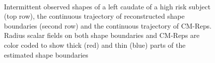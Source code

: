 \documentclass{llncs}
\begin{document}
\begin{figure}[htb!]
   \nonumber \\ \vspace{-3mm}
   \nonumber  
   \nonumber 
   \nonumber 
   \nonumber 
   \nonumber 
\caption{Intermittent observed shapes of a left caudate of a high risk subject (top row), the continuous trajectory of reconstructed shape boundaries (second row) and the continuous trajectory of CM-Reps. Radius scalar fields on both shape boundaries and CM-Reps are color coded to show thick (red) and thin (blue) parts of the estimated shape boundaries}
\label{figTrajs}
\end{figure}
\end{document}
